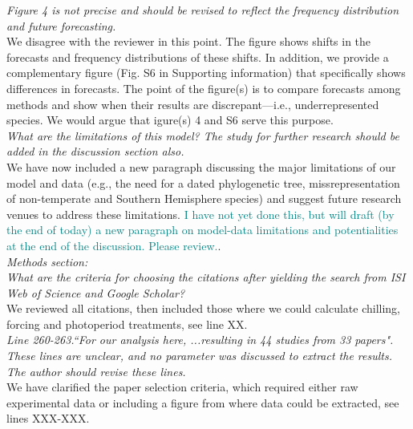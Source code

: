 \documentclass[11pt]{article}
\begin{document}
\emph{Figure 4 is not precise and should be revised to reflect the frequency distribution and future forecasting.}\\
We disagree with the reviewer in this point. The figure shows shifts in the forecasts and frequency distributions of these shifts. In addition, we provide a complementary figure (Fig. S6 in Supporting information) that specifically shows differences in forecasts. The point of the figure(s) is to compare forecasts among methods and show when their results are discrepant---i.e., underrepresented species. We would argue that igure(s) 4 and S6 serve this purpose.\\


\emph{What are the limitations of this model? The study for further research should be added in the discussion section also.}\\
We have now included a new paragraph discussing the major limitations of our model and data (e.g., the need for a dated phylogenetic tree, missrepresentation of non-temperate and Southern Hemisphere species) and suggest future research venues to address these limitations.
\textcolor{teal}{I have not yet done this, but will draft (by the end of today) a new paragraph on model-data limitations and potentialities at the end of the discussion. Please review.}.\\

\emph{Methods section:}\\
\emph{What are the criteria for choosing the citations after yielding the search from ISI Web of Science and Google Scholar?}\\
We reviewed all citations, then included those where we could calculate chilling, forcing and photoperiod treatments, see line XX. \\

\emph{Line 260-263.``For our analysis here, ...resulting in 44 studies from 33 papers". These lines are unclear, and no parameter was discussed to extract the results. The author should revise these lines.}\\
We have clarified the paper selection criteria, which required either raw experimental data or including a figure from where data could be extracted, see lines XXX-XXX. 
\end{document}
